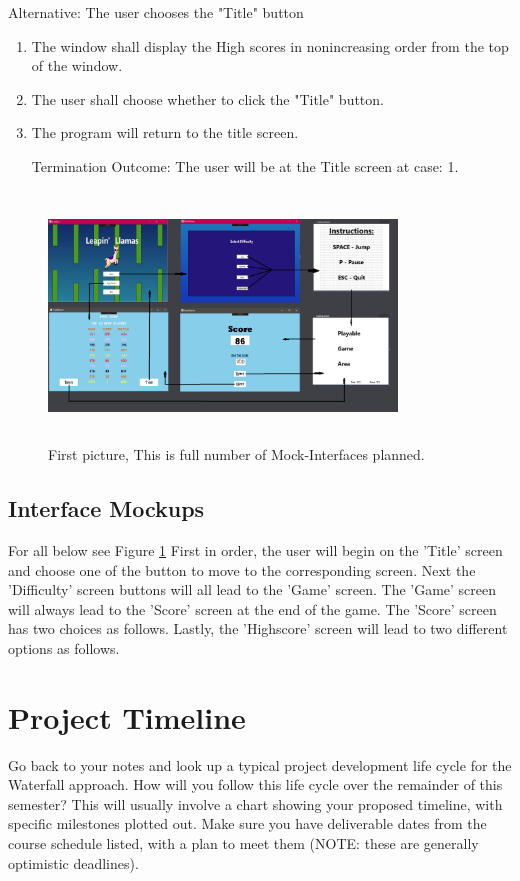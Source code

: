 \documentclass[10pt,conference,onecolumn,compsoc]{IEEEtran}
\begin{document}
Alternative: The user chooses the "Title" button
\begin{enumerate}
\item The window shall display the High scores in nonincreasing order from the top of the window.
\item The user shall choose whether to click the "Title" button.
\item The program will return to the title screen.
\item[Termination Outcome:] The user will be at the Title screen at case: 1. 
\end{enumerate}

\begin{figure}[ht!]
\includegraphics[height=250px, width=350px]{Mockup.png}
\caption{First picture, This is full number of Mock-Interfaces planned.}
\label{fig:mockup}
\end{figure}

\subsection{Interface Mockups}
For all below see Figure \ref{fig:mockup}
First in order, the user will begin on the 'Title' screen and choose one of the button to move to the corresponding screen. Next the 'Difficulty' screen buttons will all lead to the 'Game' screen. The 'Game' screen will always lead to the 'Score' screen at the end of the game. The 'Score' screen has two choices as follows. Lastly, the 'Highscore' screen will lead to two different options as follows.

\section{Project Timeline}
Go back to your notes and look up a typical project development life cycle for the Waterfall approach.  How will you follow this life cycle over the remainder of this semester?  This will usually involve a chart showing your proposed timeline, with specific milestones plotted out.  Make sure you have deliverable dates from the course schedule listed, with a plan to meet them (NOTE: these are generally optimistic deadlines).
\end{document}
